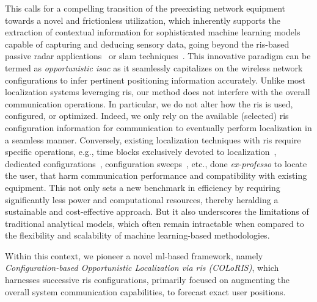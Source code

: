 \documentclass[10pt,journal,compsoc]{IEEEtran}
\newcommand{\name}{COLoRIS}
\begin{document}
This calls for a compelling transition of the preexisting network equipment towards a novel and frictionless utilization, which inherently supports the extraction of contextual information for sophisticated machine learning models capable of capturing and deducing sensory data, going beyond the \gls{ris}-based passive radar applications~\cite{FKCWS_JSAC_2022} or \gls{slam} techniques~\cite{YWJ_JSAC_2022}. This innovative paradigm can be termed as \emph{opportunistic \gls{isac}} as it seamlessly capitalizes on the wireless network configurations to infer pertinent positioning information accurately. Unlike most localization systems leveraging \gls{ris}, our method does not interfere with the overall communication operations.
In particular, we do not alter how the \gls{ris} is used, configured, or optimized.
Indeed, we only rely on the available (selected) \gls{ris} configuration information for communication to eventually perform localization in a seamless manner.
Conversely, existing localization techniques with \gls{ris} require specific operations, e.g., time blocks exclusively devoted to localization~\cite{YHLPZ_TSP_2022}, dedicated configurations~\cite{FKCWS_JSAC_2022}, configuration sweeps~\cite{abu2021near}, etc., done \emph{ex-professo} to locate the user, that harm communication performance and compatibility with existing equipment.
This not only sets a new benchmark in efficiency by requiring significantly less power and computational resources, thereby heralding a sustainable and cost-effective approach. But it also underscores the limitations of traditional analytical models, which often remain intractable when compared to the flexibility and scalability of machine learning-based methodologies.

Within this context, we pioneer a novel \gls{ml}-based framework, namely \emph{Configuration-based Opportunistic Localization via \gls{ris} (\name{})}, which harnesses successive \gls{ris} configurations, primarily focused on augmenting the overall system communication capabilities, to forecast exact user positions.
\end{document}
